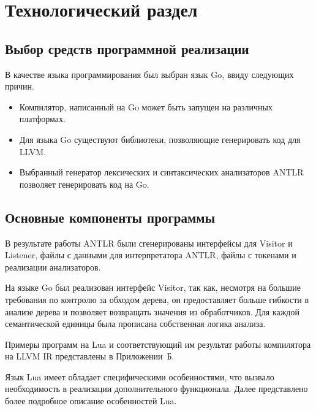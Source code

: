 \chapter{Технологический раздел}


\section{Выбор средств программной реализации}

В качестве языка программирования был выбран язык Go, ввиду следующих причин.
\begin{itemize}
	\item Компилятор, написанный на Go может быть запущен на различных платформах.
	\item Для языка Go существуют библиотеки, позволяющие генерировать код для LLVM.
	\item Выбранный генератор лексических и синтаксических анализаторов ANTLR позволяет генерировать код на Go.
\end{itemize}

\section{Основные компоненты программы}

В результате работы ANTLR были сгенерированы интерфейсы для Visitor и Listener, файлы с данными для интерпретатора ANTLR, файлы с токенами и реализации анализаторов.

На языке Go был реализован интерфейс Visitor, так как, несмотря на большие требования по контролю за обходом дерева, он предоставляет больше гибкости в анализе дерева и позволяет возвращать значения из обработчиков.
Для каждой семантической единицы была прописана собственная логика анализа. 


Примеры программ на Lua и соответствующий им результат работы компилятора на LLVM IR представлены в Приложении~Б.

Язык Lua имеет обладает специфическими особенностями, что вызвало необходимость в реализации дополнительного функционала. Далее представлено более подробное описание особенностей Lua.

